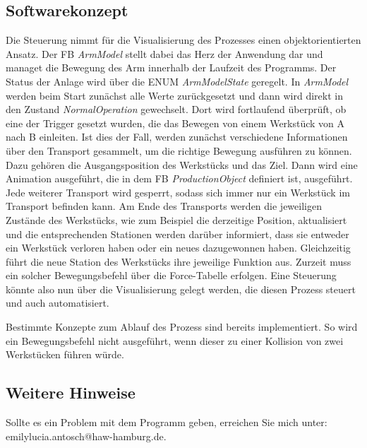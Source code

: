 \documentclass{report}
\begin{document}
\subsection{Softwarekonzept}

Die Steuerung nimmt für die Visualisierung des Prozesses einen objektorientierten Ansatz. Der FB \textit{ArmModel} stellt dabei das Herz der Anwendung dar und managet die Bewegung des Arm innerhalb der Laufzeit des Programms. Der Status der Anlage wird über die ENUM \textit{ArmModelState} geregelt. In \textit{ArmModel} werden beim Start zunächst alle Werte zurückgesetzt und dann wird direkt in den Zustand \textit{NormalOperation} gewechselt. Dort wird fortlaufend überprüft, ob eine der Trigger gesetzt wurden, die das Bewegen von einem Werkstück von A nach B einleiten. Ist dies der Fall, werden zunächst verschiedene Informationen über den Transport gesammelt, um die richtige Bewegung ausführen zu können. Dazu gehören die Ausgangsposition des Werkstücks und das Ziel. Dann wird eine Animation ausgeführt, die in dem FB \textit{ProductionObject} definiert ist, ausgeführt. Jede weiterer Transport wird gesperrt, sodass sich immer nur ein Werkstück im Transport befinden kann. Am Ende des Transports werden die jeweiligen Zustände des Werkstücks, wie zum Beispiel die derzeitige Position, aktualisiert und die entsprechenden Stationen werden darüber informiert, dass sie entweder ein Werkstück verloren haben oder ein neues dazugewonnen haben. Gleichzeitig führt die neue Station des Werkstücks ihre jeweilige Funktion aus. Zurzeit muss ein solcher Bewegungsbefehl über die Force-Tabelle erfolgen. Eine Steuerung könnte also nun über die Visualisierung gelegt werden, die diesen Prozess steuert und auch automatisiert.

Bestimmte Konzepte zum Ablauf des Prozess sind bereits implementiert. So wird ein Bewegungsbefehl nicht ausgeführt, wenn dieser zu einer Kollision von zwei Werkstücken führen würde.

\subsection{Weitere Hinweise}

Sollte es ein Problem mit dem Programm geben, erreichen Sie mich unter: emilylucia.antosch@haw-hamburg.de. 
\end{document}
